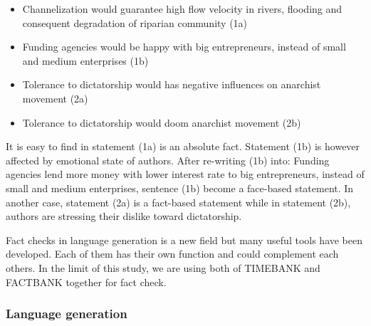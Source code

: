 \begin{itemize}
	\item Channelization would guarantee high flow velocity in rivers, flooding and consequent degradation of riparian community (1a)
	\item Funding agencies would be happy with big entrepreneurs, instead of small and medium enterprises (1b)
	\item Tolerance to dictatorship would has negative influences on anarchist movement (2a)
	\item Tolerance to dictatorship would doom anarchist movement (2b)
\end{itemize}

It is easy to find in statement (1a) is an absolute fact. 
Statement (1b) is however affected by emotional state of authors. 
After re-writing (1b) into: Funding agencies lend more money with lower interest rate to big entrepreneurs, instead of small 
and medium enterprises,
sentence (1b) become a face-based statement. 
In another case, statement (2a) is a fact-based statement while in statement (2b), authors are stressing their dislike toward dictatorship.

Fact checks in language generation is a new field but many useful tools have been developed. 
Each of them has their own function and could complement each others. 
In the limit of this study, we are using both of TIMEBANK and FACTBANK together for fact check.



\subsubsection*{Language generation}

